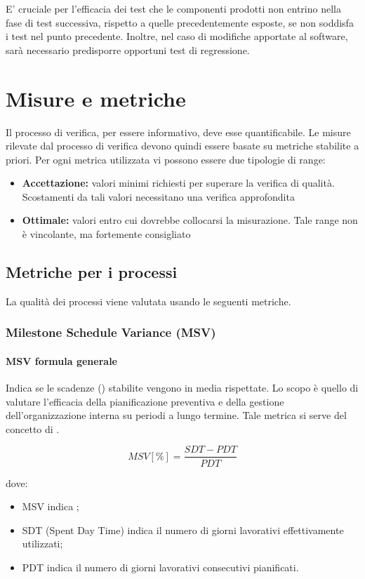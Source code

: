 \documentclass[12pt,a4paper]{article}
\begin{document}
	E' cruciale per l'efficacia dei test che le componenti prodotti non entrino nella fase di test successiva, rispetto a quelle precedentemente esposte, se non soddisfa i test nel punto precedente.
	Inoltre, nel caso di modifiche apportate al software, sarà necessario predisporre opportuni test di regressione.
	\newpage
	
	\section{Misure e metriche}\label{metriche}
	Il processo di verifica, per essere informativo, deve esse quantificabile. Le misure rilevate dal processo di verifica devono quindi essere basate su metriche stabilite a priori. Per ogni metrica utilizzata vi possono essere due tipologie di range:
	
	\begin{itemize}
		\item \textbf{Accettazione:} valori minimi richiesti per superare la verifica di qualità. Scostamenti da tali valori necessitano una verifica approfondita
		\item \textbf{Ottimale:} valori entro cui dovrebbe collocarsi la misurazione. Tale range non è vincolante, ma fortemente consigliato
	\end{itemize}
	
	\subsection{Metriche per i processi}\label{metriche_processi}
	La qualità dei processi viene valutata usando le seguenti metriche.
	
	\subsubsection{Milestone Schedule Variance (MSV)}
	\paragraph{MSV formula generale}
	
	Indica se le scadenze () stabilite vengono in media rispettate. Lo scopo è quello di valutare l'efficacia della pianificazione preventiva e della gestione dell'organizzazione interna su periodi a lungo termine. Tale metrica si serve del concetto di .
	
	\[MSV [\%] = \frac{SDT - PDT}{PDT}\]
	
	dove: 
	\begin{itemize}
		\item MSV indica \MSV;
		\item SDT (Spent Day Time) indica il numero di giorni lavorativi effettivamente utilizzati;
		\item  PDT indica il numero di giorni lavorativi consecutivi pianificati.
	\end{itemize}
	
\end{document}
